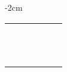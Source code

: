 \begin{center}
\begin{adjustwidth}{-2cm}{}
\begin{tabular}{|c c c c c c|}
             &  &  &  &  &  \\
             &  &  &  &  &  \\
             &  &  &  &  &  \\
             &  &  &  &  &  \\
             &  &  &  &  &  \\
             &  &  &  &  &  \\
             &  &  &  &  &  \\
             &  &  &  &  &  \\
             &  &  &  &  &  \\
             &  &  &  &  &  \\
             &  &  &  &  &  \\
             &  &  &  &  &  \\
            \hline
        \end{tabular}
    \end{adjustwidth}
\end{center}

